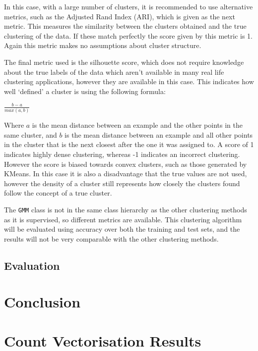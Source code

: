 \documentclass{article}
\begin{document}
In this case, with a large number of clusters, it is recommended to use alternative metrics, such as the Adjusted Rand Index (ARI), which is given as the next metric. This measures the similarity between the clusters obtained and the true clustering of the data. If these match perfectly the score given by this metric is 1. Again this metric makes no assumptions about cluster structure.

The final metric used is the silhouette score, which does not require knowledge about the true labels of the data which aren't available in many real life clustering applications, however they are available in this case.  This indicates how well `defined' a cluster is using the following formula:

\begin{center}
$\frac{b-a}{max(a,b)}$
\end{center}

Where $a$ is the mean distance between an example and the other points in the same cluster, and $b$ is the mean distance between an example and all other points in the cluster that is the next closest after the one it was assigned to. A score of 1 indicates highly dense clustering, whereas -1 indicates an incorrect clustering. However the score is biased towards convex clusters, such as those generated by KMeans. In this case it is also a disadvantage that the true values are not used, however the density of a cluster still represents how closely the clusters found follow the concept of a true cluster.

The \verb|GMM| class is not in the same class hierarchy as the other clustering methods as it is supervised, so different metrics are available. This clustering algorithm will be evaluated using accuracy over both the training and test sets, and the results will not be very comparable with the other clustering methods.  

\subsection{Evaluation}

\section{Conclusion}

\appendix

\section{Count Vectorisation Results}
\end{document}
